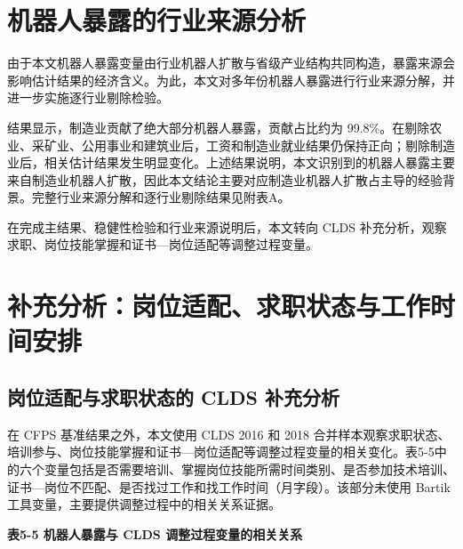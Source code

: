 \documentclass[UTF8, zihao=-4, a4paper, openany, fontset=none]{ctexrep}
\numberwithin{equation}{chapter}
\begin{document}
\section{机器人暴露的行业来源分析}\label{ux673aux5668ux4ebaux66b4ux9732ux7684ux884cux4e1aux6765ux6e90ux5206ux6790}

由于本文机器人暴露变量由行业机器人扩散与省级产业结构共同构造，暴露来源会影响估计结果的经济含义。为此，本文对多年份机器人暴露进行行业来源分解，并进一步实施逐行业剔除检验。

结果显示，制造业贡献了绝大部分机器人暴露，贡献占比约为 99.8\%。在剔除农业、采矿业、公用事业和建筑业后，工资和制造业就业结果仍保持正向；剔除制造业后，相关估计结果发生明显变化。上述结果说明，本文识别到的机器人暴露主要来自制造业机器人扩散，因此本文结论主要对应制造业机器人扩散占主导的经验背景。完整行业来源分解和逐行业剔除结果见附表A。

在完成主结果、稳健性检验和行业来源说明后，本文转向 CLDS 补充分析，观察求职、岗位技能掌握和证书---岗位适配等调整过程变量。

\section{补充分析：岗位适配、求职状态与工作时间安排}\label{ux8865ux5145ux5206ux6790ux5c97ux4f4dux9002ux914dux6c42ux804cux72b6ux6001ux4e0eux5de5ux4f5cux65f6ux95f4ux5b89ux6392}

\subsection{岗位适配与求职状态的 CLDS 补充分析}\label{ux5c97ux4f4dux9002ux914dux4e0eux6c42ux804cux72b6ux6001ux7684-clds-ux8865ux5145ux5206ux6790}

在 CFPS 基准结果之外，本文使用 CLDS 2016 和 2018 合并样本观察求职状态、培训参与、岗位技能掌握和证书---岗位适配等调整过程变量的相关变化。表5-5中的六个变量包括是否需要培训、掌握岗位技能所需时间类别、是否参加技术培训、证书---岗位不匹配、是否找过工作和找工作时间（月字段）。该部分未使用 Bartik 工具变量，主要提供调整过程中的相关关系证据。

\textbf{表5-5 机器人暴露与 CLDS 调整过程变量的相关关系}
\end{document}
